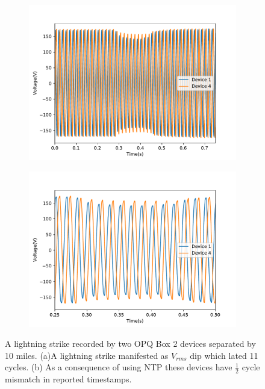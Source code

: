 \begin{figure}[h]
		\centering
	\begin{subfigure}{.5\textwidth}
	  \centering
	  \includegraphics[width=0.9\linewidth]{img/voltage_sag.pdf}
	  \caption{}
	  \label{fig6:sub1}
	\end{subfigure}%
	\begin{subfigure}{.5\textwidth}
	  \centering
	  \includegraphics[width=0.9\linewidth]{img/voltage_sag_zoomed_in.pdf}
	  \caption{}
	  \label{fig6:sub2}
	\end{subfigure}
	\caption{A lightning strike recorded by two OPQ Box 2 devices separated by 10 miles. (a)A lightning strike manifested as $V_{rms}$ dip which lated 11 cycles. (b) As a consequence of using NTP these devices have $\frac{1}{2}$ cycle mismatch in reported timestamps.}
	\label{fig:6}
\end{figure}

